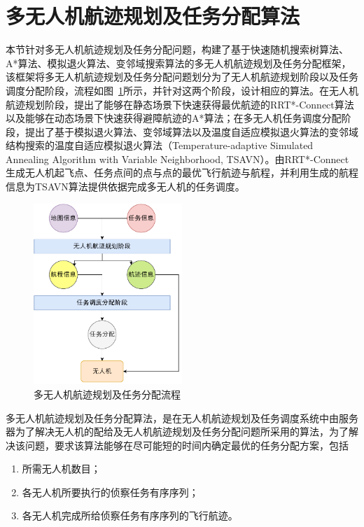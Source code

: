 
\section{多无人机航迹规划及任务分配算法}

本节针对多无人机航迹规划及任务分配问题，构建了基于快速随机搜索树算法、A*算法、模拟退火算法、变邻域搜索算法的多无人机航迹规划及任务分配框架，该框架将多无人机航迹规划及任务分配问题划分为了无人机航迹规划阶段以及任务调度分配阶段，流程如图~\ref{fig:多无人机航迹规划及任务分配流程}所示，并针对这两个阶段，设计相应的算法。在无人机航迹规划阶段，提出了能够在静态场景下快速获得最优航迹的RRT*-Connect算法以及能够在动态场景下快速获得避障航迹的A*算法；在多无人机任务调度分配阶段，提出了基于模拟退火算法、变邻域算法以及温度自适应模拟退火算法\citep{wu2017SatelliteObservationSchedulinga}的变邻域结构搜索的温度自适应模拟退火算法（Temperature-adaptive Simulated Annealing Algorithm with Variable Neighborhood, TSAVN）。由RRT*-Connect生成无人机起飞点、任务点间的点与点的最优飞行航迹与航程，并利用生成的航程信息为TSAVN算法提供依据完成多无人机的任务调度。

\begin{figure}[!htbp]
    \centering
    \includegraphics[width=0.5\textwidth]{images/多无人机任务分配及航迹规划流程.drawio.pdf}
    \caption{多无人机航迹规划及任务分配流程}
    \label{fig:多无人机航迹规划及任务分配流程}
\end{figure}

多无人机航迹规划及任务分配算法，是在无人机航迹规划及任务调度系统中由服务器为了解决无人机的配给及无人机航迹规划及任务分配问题所采用的算法，为了解决该问题，要求该算法能够在尽可能短的时间内确定最优的任务分配方案，包括

\begin{enumerate}[label=(\arabic*)]
    \item {所需无人机数目；}
    \item {各无人机所要执行的侦察任务有序序列；}
    \item {各无人机完成所给侦察任务有序序列的飞行航迹。}
\end{enumerate}

